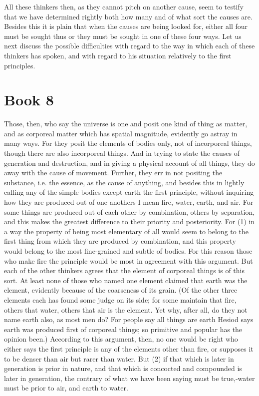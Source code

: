 \documentclass[oneside, 17pt, dvipsnames]{extbook}
\begin{document}
All these thinkers then, as they cannot pitch on another cause, seem to testify that we have determined rightly both how many and of what sort the causes are. Besides this it is plain that when the causes are being looked for, either all four must be sought thus or they must be sought in one of these four ways. Let us next discuss the possible difficulties with regard to the way in which each of these thinkers has spoken, and with regard to his situation relatively to the first principles.





\newpage
\section{Book 8}

Those, then, who say the universe is one and posit one kind of thing as matter, and as corporeal matter which has spatial magnitude, evidently go astray in many ways. For they posit the elements of bodies only, not of incorporeal things, though there are also incorporeal things. And in trying to state the causes of generation and destruction, and in giving a physical account of all things, they do away with the cause of movement. Further, they err in not positing the substance, i.e. the essence, as the cause of anything, and besides this in lightly calling any of the simple bodies except earth the first principle, without inquiring how they are produced out of one anothers-I mean fire, water, earth, and air. For some things are produced out of each other by combination, others by separation, and this makes the greatest difference to their priority and posteriority. For (1) in a way the property of being most elementary of all would seem to belong to the first thing from which they are produced by combination, and this property would belong to the most fine-grained and subtle of bodies. For this reason those who make fire the principle would be most in agreement with this argument. But each of the other thinkers agrees that the element of corporeal things is of this sort. At least none of those who named one element claimed that earth was the element, evidently because of the coarseness of its grain. (Of the other three elements each has found some judge on its side; for some maintain that fire, others that water, others that air is the element. Yet why, after all, do they not name earth also, as most men do? For people say all things are earth Hesiod says earth was produced first of corporeal things; so primitive and popular has the opinion been.) According to this argument, then, no one would be right who either says the first principle is any of the elements other than fire, or supposes it to be denser than air but rarer than water. But (2) if that which is later in generation is prior in nature, and that which is concocted and compounded is later in generation, the contrary of what we have been saying must be true,-water must be prior to air, and earth to water.
\end{document}
